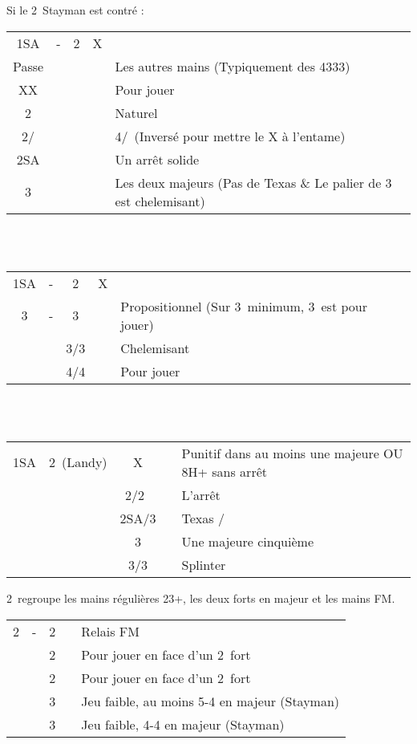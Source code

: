 \documentclass[a4paper, oneside, 11pt]{report}
\begin{document}
		Si le 2\trefle\ Stayman est contré :\\
		\begin{tabular}{cccc|l}
		1SA & - & 2\trefle & X &\\
		Passe &&&& Les autres mains (Typiquement des 4333)\\
		XX &&&& Pour jouer\\
		2\carreau &&&& Naturel\\
		2\coeur/\pique &&&& 4\pique/\coeur\ (Inversé pour mettre le X à l'entame)\\
		2SA &&&& Un arrêt solide\\
		3\trefle &&&& Les deux majeurs (Pas de Texas \& Le palier de 3 est chelemisant)\\
		\end{tabular}\\\\
		
		\begin{tabular}{cccc|l}
		1SA & - & 2\trefle & X &\\
		3\trefle & - & 3\carreau && Propositionnel (Sur 3\coeur\ minimum, 3\pique\ est pour jouer)\\
		&& 3\coeur/3\pique && Chelemisant\\
		&& 4\coeur/4\pique && Pour jouer\\
		\end{tabular}\\\\
		
		\begin{tabular}{cccc|l}
		1SA & 2\trefle\ (Landy) & X && Punitif dans au moins une majeure OU 8H+ sans arrêt\\
		&& 2\coeur/2\pique\ && L'arrêt\\
		&& 2SA/3\trefle && Texas \trefle/\carreau\\
		&& 3\carreau && Une majeure cinquième\\
		&& 3\coeur/3\pique && Splinter\\
		\end{tabular}

	2\trefle\ regroupe les mains régulières 23+, les deux forts en majeur et les mains FM.\\
	
	\begin{tabular}{cccc|l}
	2\trefle & - & 2\carreau && Relais FM\\
	&& 2\coeur && Pour jouer en face d'un 2\coeur\ fort\\
	&& 2\pique && Pour jouer en face d'un 2\pique\ fort\\
	&& 3\trefle && Jeu faible, au moins 5-4 en majeur (Stayman)\\
	&& 3\carreau && Jeu faible, 4-4 en majeur (Stayman)\\
	\end{tabular}\\\\
	
\end{document}
